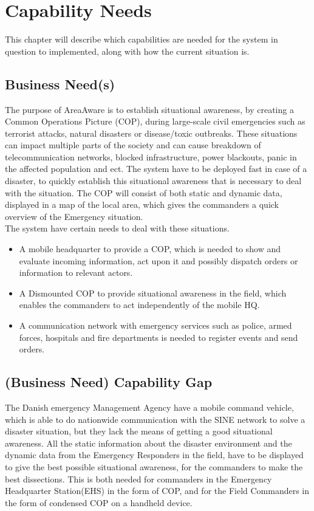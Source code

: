 \chapter{Capability Needs}
\label{chp_need}

This chapter will describe which capabilities are needed for the system in question to implemented, along with how the current situation is.

\section{Business Need(s)}

The purpose of AreaAware is to establish situational awareness, by creating a Common Operations Picture (COP), during large-scale civil emergencies such as terrorist attacks, natural disasters or disease/toxic outbreaks. These situations can impact multiple parts of the society and can cause breakdown of telecommunication networks, blocked infrastructure, power blackouts, panic in the affected population and ect. The system have to be deployed fast in case of a disaster, to quickly establish this situational awareness that is necessary to deal with the situation. The COP will consist of both static and dynamic data, displayed in a map of the local area, which gives the commanders a quick overview of the Emergency situation. \\

\noindent The system have certain needs to deal with these situations.

\begin{itemize}
  \item A mobile headquarter to provide a COP, which is needed to show and evaluate incoming information, act upon it and possibly dispatch orders or information to relevant actors.
  \item A Dismounted COP to provide situational awareness in the field, which enables the commanders to act independently of the mobile HQ.
  \item A communication network with emergency services such as police, armed forces, hospitals and fire departments is needed to register events and send orders.
\end{itemize}

\section{(Business Need) Capability Gap}

The Danish emergency Management Agency have a mobile command vehicle, which is able to do nationwide communication with the SINE network to solve a disaster situation, but they lack the means of getting a good situational awareness. All the static information about the disaster environment and the dynamic data from the Emergency Responders in the field, have to be displayed to give the best possible situational awareness, for the commanders to make the best dissections. This is both needed for commanders in the Emergency Headquarter Station(EHS) in the form of COP, and for the Field Commanders in the form of condensed COP on a handheld device.

